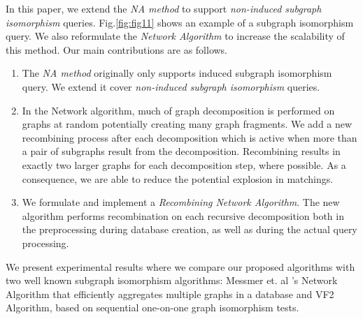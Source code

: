 In this paper, we extend the \textit{NA method} to support \textit{non-induced subgraph isomorphism} queries.
Fig.\ref{fig:fig11} shows an example of a subgraph isomorphism query. We also reformulate the \textit{Network Algorithm} to increase the scalability of this method.
Our main contributions are as follows.

\begin{enumerate}
\item The \textit{NA method} originally only supports induced subgraph isomorphism query. We extend it  cover \textit{non-induced subgraph isomorphism} queries.
\item  In the Network algorithm, much of graph decomposition is performed on graphs at random potentially creating many graph fragments. We add a new recombining process after each decomposition which is active when more than a pair of  subgraphs result from the decomposition.  Recombining results in exactly  two larger graphs for each decomposition step, where possible.  As a consequence, we are able to reduce the potential  explosion in matchings. 
\item We formulate and implement  a  \textit{Recombining  Network Algorithm}. The new algorithm performs recombination on  each recursive decomposition both in the  preprocessing during database creation, as well as during the actual query processing. 
\end{enumerate}

We present experimental results where we compare our proposed algorithms with two well known subgraph isomorphism algorithms: Messmer et. al 's\cite{messmer} Network Algorithm that efficiently aggregates multiple graphs in a database
 and VF2\cite{vf} Algorithm, based on sequential one-on-one graph isomorphism tests. 
